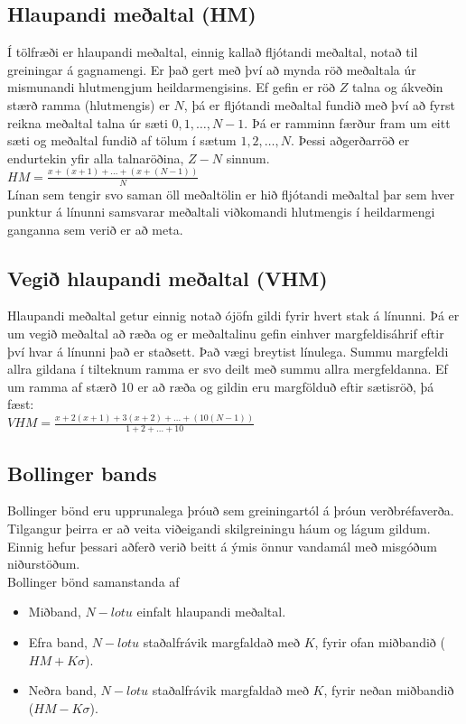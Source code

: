 \documentclass{article}
\begin{document}
\subsection{Hlaupandi meðaltal (HM)}
Í tölfræði er hlaupandi meðaltal, einnig kallað
fljótandi meðaltal, notað til greiningar á gagnamengi. 
Er það gert með því að mynda röð meðaltala úr
mismunandi hlutmengjum heildarmengisins.
Ef gefin er röð $Z$ talna og ákveðin stærð ramma
(hlutmengis) er $N$, þá er fljótandi meðaltal fundið
með því að fyrst reikna meðaltal 
talna úr sæti $0,1,\dots,N-1$. Þá er ramminn færður
fram um eitt sæti og meðaltal fundið af tölum í sætum
$1,2,\dots,N$. 
Þessi aðgerðarröð er endurtekin yfir alla talnaröðina,
$Z-N$ sinnum.  \\

$HM = \frac{x+(x+1)+\dots+(x+(N-1))}{N}$
\\
Línan sem tengir svo saman öll meðaltölin er hið
fljótandi meðaltal þar sem hver punktur á línunni
samsvarar 
meðaltali viðkomandi hlutmengis í heildarmengi ganganna
sem verið er að meta. 
 
\subsection{Vegið hlaupandi meðaltal (VHM)}
Hlaupandi meðaltal getur einnig notað ójöfn gildi fyrir
hvert stak á línunni.
Þá er um vegið meðaltal að ræða og er meðaltalinu gefin
einhver margfeldisáhrif eftir því hvar á línunni það er
staðsett. 
Það vægi breytist línulega. Summu margfeldi allra
gildana í tilteknum ramma er svo deilt með summu allra
mergfeldanna. 
Ef um ramma af stærð 10 er að ræða og gildin eru
margfölduð eftir sætisröð, þá fæst: \\
$VHM =
\frac{x+2(x+1)+3(x+2)+\dots+(10(N-1))}{1+2+\dots+10}$
\subsection{Bollinger bands}
\label{sec:third}
Bollinger bönd eru upprunalega þróuð sem greiningartól
á þróun verðbréfaverða. 
Tilgangur þeirra er að veita viðeigandi skilgreiningu
háum og lágum gildum. Einnig hefur þessari aðferð verið
beitt á ýmis önnur
vandamál með misgóðum niðurstöðum. \\
Bollinger bönd samanstanda af
\begin{itemize}
  \item Miðband, $N-lotu$ einfalt hlaupandi meðaltal.
  \item Efra band, $N-lotu$ staðalfrávik margfaldað með
$K$, fyrir ofan miðbandið ($HM + K\sigma$).
  \item Neðra band, $N-lotu$ staðalfrávik margfaldað
með $K$, fyrir neðan miðbandið ($HM -
K\sigma$).%
\end{itemize}
\end{document}
